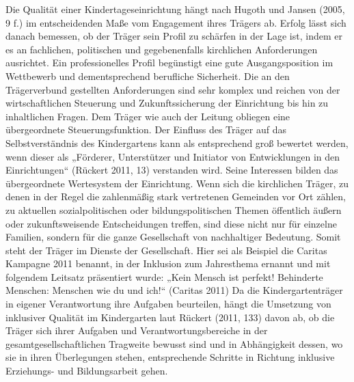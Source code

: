 Die Qualität einer Kindertageseinrichtung hängt nach Hugoth und Jansen (2005, 9 f.) im entscheidenden Maße vom Engagement ihres Trägers ab. Erfolg lässt sich danach bemessen, ob der Träger sein Profil zu schärfen in der Lage ist, indem er es an fachlichen, politischen und gegebenenfalls kirchlichen Anforderungen ausrichtet. Ein professionelles Profil begünstigt eine gute Ausgangsposition im Wettbewerb und dementsprechend berufliche Sicherheit. Die an den Trägerverbund gestellten Anforderungen sind sehr komplex und reichen von der wirtschaftlichen Steuerung und Zukunftssicherung der Einrichtung bis hin zu inhaltlichen Fragen. Dem Träger wie auch der Leitung obliegen eine übergeordnete Steuerungsfunktion. Der Einfluss des Träger auf das Selbstverständnis des Kindergartens kann als entsprechend groß bewertet werden, wenn dieser als „Förderer, Unterstützer und Initiator von Entwicklungen in den Einrichtungen“ (Rückert 2011, 13) verstanden wird. Seine Interessen bilden das übergeordnete Wertesystem der Einrichtung. Wenn sich die kirchlichen Träger, zu denen in der Regel die zahlenmäßig stark vertretenen Gemeinden vor Ort zählen, zu aktuellen sozialpolitischen oder bildungspolitischen Themen öffentlich äußern oder zukunftsweisende Entscheidungen treffen, sind diese nicht nur für einzelne Familien, sondern für die ganze Gesellschaft von nachhaltiger Bedeutung. Somit steht der Träger im Dienste der Gesellschaft. Hier sei als Beispiel die Caritas Kampagne 2011 benannt, in der Inklusion zum Jahresthema ernannt und mit folgendem Leitsatz präsentiert wurde: „Kein Mensch ist perfekt! Behinderte Menschen: Menschen wie du und ich!“ (Caritas 2011) Da die Kindergartenträger in eigener Verantwortung ihre Aufgaben beurteilen, hängt die Umsetzung von inklusiver Qualität im Kindergarten laut Rückert (2011, 133) davon ab,  ob die Träger sich ihrer Aufgaben und Verantwortungsbereiche in der gesamtgesellschaftlichen Tragweite bewusst sind und in Abhängigkeit dessen, wo sie in ihren Überlegungen stehen, entsprechende Schritte in Richtung inklusive Erziehungs- und Bildungsarbeit gehen.  
   
